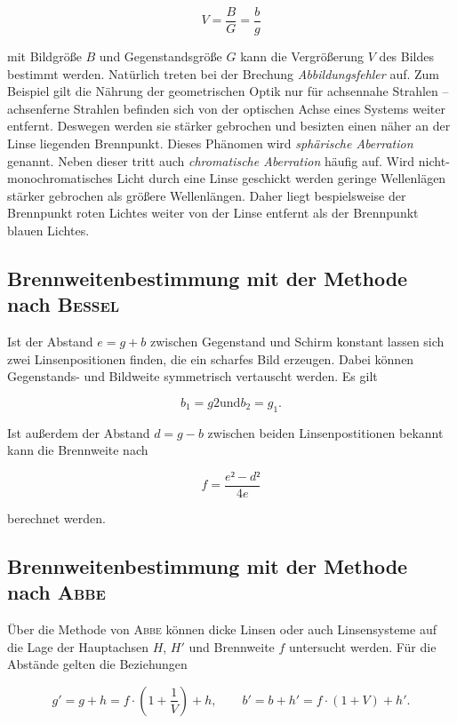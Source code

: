 \begin{equation}
	V=\frac{B}{G}=\frac{b}{g}
\end{equation}

mit Bildgröße $B$ und Gegenstandsgröße $G$ kann die Vergrößerung $V$ des Bildes bestimmt werden.
Natürlich treten bei der Brechung \emph{Abbildungsfehler} auf.
Zum Beispiel gilt die Nährung der geometrischen Optik nur für achsennahe Strahlen -- achsenferne Strahlen befinden sich von der optischen Achse eines Systems weiter entfernt. 
Deswegen werden sie stärker gebrochen und besizten einen näher an der Linse liegenden Brennpunkt. Dieses Phänomen wird \emph{sphärische Aberration} genannt. 
Neben dieser tritt auch \emph{chromatische Aberration} häufig auf. 
Wird nicht-monochromatisches Licht durch eine Linse geschickt werden geringe Wellenlägen stärker gebrochen als größere Wellenlängen. 
Daher liegt bespielsweise der Brennpunkt roten Lichtes weiter von der Linse entfernt als der Brennpunkt blauen Lichtes.

\subsection{Brennweitenbestimmung mit der Methode nach \textsc{Bessel}}

Ist der Abstand $e=g+b$ zwischen Gegenstand und Schirm konstant lassen sich zwei Linsenpositionen finden, die ein scharfes Bild erzeugen. Dabei können Gegenstands- und Bildweite symmetrisch vertauscht werden. 
Es gilt

\begin{equation}
	b_1=g2 \text{und} b_2=g_1.
\end{equation}

Ist außerdem der Abstand $d=g-b$ zwischen beiden Linsenpostitionen bekannt kann die Brennweite nach

\begin{equation}
	f=\frac{e²-d²}{4e}
\end{equation}

berechnet werden.

\subsection{Brennweitenbestimmung mit der Methode nach \textsc{Abbe}}

Über die Methode von \textsc{Abbe} können dicke Linsen oder auch Linsensysteme auf die Lage der Hauptachsen $H$, $H'$ und Brennweite $f$ untersucht werden. 
Für die Abstände gelten die Beziehungen

\begin{equation}
	g'=g+h=f\cdot\left(1+\frac{1}{V}\right)+h,\qquad
	b'=b+h'=f\cdot\left(1+V\right)+h'.
\end{equation}
